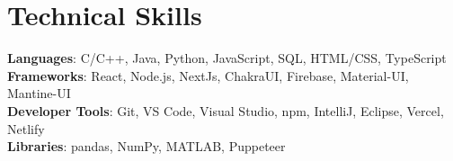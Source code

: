 \documentclass[letterpaper,11pt]{article}
\begin{document}
\section{Technical Skills}
 \begin{itemize}[leftmargin=0.15in, label={}]
    \small{\item{
     \textbf{Languages}{: C/C++, Java, Python, JavaScript, SQL, HTML/CSS, TypeScript} \\
     \textbf{Frameworks}{: React, Node.js, NextJs, ChakraUI, Firebase, Material-UI, Mantine-UI} \\
     \textbf{Developer Tools}{: Git, VS Code, Visual Studio, npm, IntelliJ, Eclipse, Vercel, Netlify} \\
     \textbf{Libraries}{: pandas, NumPy, MATLAB, Puppeteer}
    }}
 \end{itemize}


\end{document}

